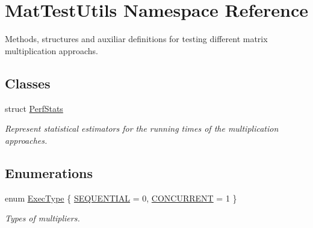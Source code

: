 \hypertarget{namespaceMatTestUtils}{}\section{Mat\+Test\+Utils Namespace Reference}
\label{namespaceMatTestUtils}


Methods, structures and auxiliar definitions for testing different matrix multiplication approachs.  


\subsection*{Classes}
\begin{DoxyCompactItemize}
\item 
struct \mbox{\hyperlink{structMatTestUtils_1_1PerfStats}{Perf\+Stats}}
\begin{DoxyCompactList}\small\item\em Represent statistical estimators for the running times of the multiplication approaches. \end{DoxyCompactList}\end{DoxyCompactItemize}
\subsection*{Enumerations}
\begin{DoxyCompactItemize}
\item 
enum \mbox{\hyperlink{namespaceMatTestUtils_a8ce892071d861e65dd62ef377efaaa6b}{Exec\+Type}} \{ \mbox{\hyperlink{namespaceMatTestUtils_a8ce892071d861e65dd62ef377efaaa6ba3b3a618fe07801523cfe25e59e502fa4}{S\+E\+Q\+U\+E\+N\+T\+I\+AL}} = 0, 
\mbox{\hyperlink{namespaceMatTestUtils_a8ce892071d861e65dd62ef377efaaa6ba5badfe0e296c0508584ff1561872a74c}{C\+O\+N\+C\+U\+R\+R\+E\+NT}} = 1
 \}
\begin{DoxyCompactList}\small\item\em Types of multipliers. \end{DoxyCompactList}\end{DoxyCompactItemize}
